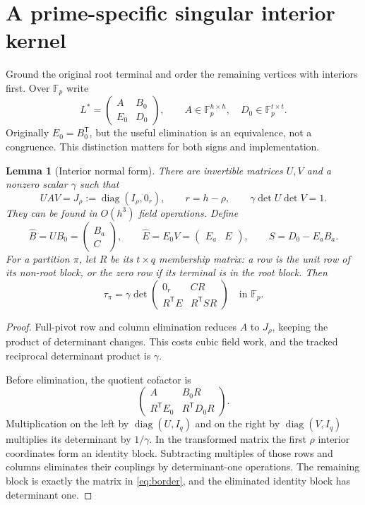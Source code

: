 \documentclass[11pt,letterpaper]{article}
\newtheorem{lemma}[theorem]{Lemma}
\theoremstyle{definition}\newtheorem{definition}[theorem]{Definition}
\theoremstyle{remark}\newtheorem{remark}[theorem]{Remark}
\newcommand{\F}{\mathbb F}
\newcommand{\diag}{\operatorname{diag}}
\newcommand{\trans}{^{\mathsf T}}
\begin{document}
\section{A prime-specific singular interior kernel}
\label{sec:kernel}

Ground the original root terminal and order the remaining vertices with interiors first. Over $\F_p$ write
\begin{equation}
 L^*=\begin{pmatrix} A&B_0\\ E_0&D_0\end{pmatrix},
 \qquad A\in\F_p^{h\times h},\quad D_0\in\F_p^{t\times t}.
 \label{eq:ground}
\end{equation}
Originally $E_0=B_0\trans$, but the useful elimination is an equivalence, not a congruence. This distinction matters for both signs and implementation.

\begin{lemma}[Interior normal form]
\label{lem:interior}
There are invertible matrices $U,V$ and a nonzero scalar $\gamma$ such that
\[
 UAV=J_\rho:=\diag(I_\rho,0_r),\qquad
 r=h-\rho,\qquad \gamma\det U\det V=1.
\]
They can be found in $O(h^3)$ field operations. Define
\[
 \widehat B=UB_0=\begin{pmatrix}B_a\\C\end{pmatrix},\qquad
 \widehat E=E_0V=\begin{pmatrix}E_a&E\end{pmatrix},\qquad
 S=D_0-E_aB_a.
\]
For a partition $\pi$, let $R$ be its $t\times q$ membership matrix: a row is the unit row of its non-root block, or the zero row if its terminal is in the root block. Then
\begin{equation}
 \tau_\pi=\gamma\det
 \begin{pmatrix}
 0_r&CR\\ R\trans E&R\trans SR
 \end{pmatrix}
 \quad\text{in }\F_p.
 \label{eq:border}
\end{equation}
\end{lemma}
\begin{proof}
Full-pivot row and column elimination reduces $A$ to $J_\rho$, keeping the product of determinant changes. This costs cubic field work, and the tracked reciprocal determinant product is $\gamma$.

Before elimination, the quotient cofactor is
\[
 \begin{pmatrix}A&B_0R\\R\trans E_0&R\trans D_0R\end{pmatrix}.
\]
Multiplication on the left by $\diag(U,I_q)$ and on the right by $\diag(V,I_q)$ multiplies its determinant by $1/\gamma$. In the transformed matrix the first $\rho$ interior coordinates form an identity block. Subtracting multiples of those rows and columns eliminates their couplings by determinant-one operations. The remaining block is exactly the matrix in \eqref{eq:border}, and the eliminated identity block has determinant one.
\end{proof}
\end{document}

